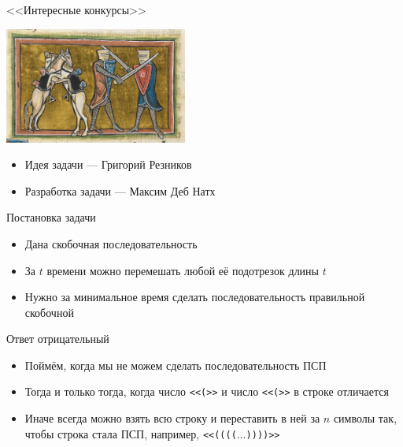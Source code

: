 \begin{frame}
  \begin{center}
    \LARGE <<Интересные конкурсы>>
  \end{center}

      \begin{center}
      \includegraphics[width=6cm]{memes/a-meme.jpg}
  \end{center}


  \begin{itemize}
  \item Идея задачи --- Григорий Резников
  \item Разработка задачи --- Максим Деб Натх
  \end{itemize}

\end{frame}

\begin{frame}{Постановка задачи}

  \begin{itemize}
  \item Дана скобочная последовательность
  \item За $t$ времени можно перемешать любой её подотрезок длины $t$
  \item Нужно за минимальное время сделать последовательность правильной скобочной
  \end{itemize}
  
\end{frame}

\begin{frame}{Ответ отрицательный}
  \begin{itemize}
  \item Поймём, когда мы не можем сделать последовательность ПСП
  \item Тогда и только тогда, когда число \texttt{<<(>>} и число \texttt{<<(>>} в строке отличается
  \item Иначе всегда можно взять всю строку и переставить в ней за $n$ символы так, чтобы строка стала ПСП, например, \texttt{<<(((($\dots$))))>>}
  \end{itemize}
\end{frame}

